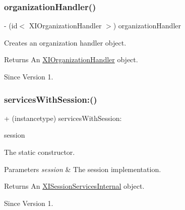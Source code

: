 \subsubsection{\texorpdfstring{organization\+Handler()}{organizationHandler()}}
{\footnotesize\ttfamily -\/ (id$<$ X\+I\+Organization\+Handler $>$) organization\+Handler \begin{DoxyParamCaption}{ }\end{DoxyParamCaption}}



Creates an organization handler object. 

\begin{DoxyReturn}{Returns}
An \hyperlink{class_x_i_organization_handler-p}{X\+I\+Organization\+Handler} object. 
\end{DoxyReturn}
\begin{DoxySince}{Since}
Version 1. 
\end{DoxySince}
\hypertarget{interface_x_i_session_services_internal_a9821bd470bc2299ba66b458301f6a9e5}{}\label{interface_x_i_session_services_internal_a9821bd470bc2299ba66b458301f6a9e5} 
\subsubsection{\texorpdfstring{services\+With\+Session\+:()}{servicesWithSession:()}}
{\footnotesize\ttfamily + (instancetype) services\+With\+Session\+: \begin{DoxyParamCaption}\item[{(\hyperlink{interface_x_i_session_internal}{X\+I\+Session\+Internal} $\ast$)}]{session }\end{DoxyParamCaption}}



The static constructor. 


\begin{DoxyParams}{Parameters}
{\em session} & The session implementation. \\
\hline
\end{DoxyParams}
\begin{DoxyReturn}{Returns}
An \hyperlink{interface_x_i_session_services_internal}{X\+I\+Session\+Services\+Internal} object. 
\end{DoxyReturn}
\begin{DoxySince}{Since}
Version 1. 
\end{DoxySince}
\hypertarget{interface_x_i_session_services_internal_ae7d776f871143a3001d9f24fa1ca27cd}{}\label{interface_x_i_session_services_internal_ae7d776f871143a3001d9f24fa1ca27cd} 
